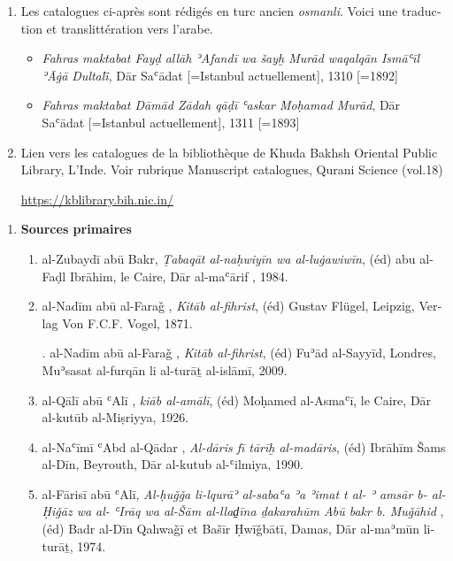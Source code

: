\documentclass[a4paper,12pt]{report}
\begin{document}
\begin{french}
\begin{enumerate}
\item Les catalogues ci-après sont rédigés en turc ancien \textit{osmanli}. Voici une traduction et translittération vers l'arabe.

\begin{itemize}
    \item  \textit{Fahras maktabat Fayḍ allāh ʾAfandī wa šayḫ Murād waqalqān Ismāʿīl  ʾĀġā Dultali}̄,  Dār Saʿādat [=Istanbul actuellement], 1310 [=1892]  
    
    \item \textit{ Fahras maktabat Dāmād Zādah qāḍī ʿaskar Moḥamad Murād},  Dār Saʿādat [=Istanbul actuellement], 1311 [=1893]  
\end{itemize}
    \item  Lien vers les catalogues de la bibliothèque de  Khuda Bakhsh Oriental Public Library, L'Inde.   Voir rubrique Manuscript catalogues, Qurani Science (vol.18)
  
  \url{https://kblibrary.bih.nic.in/}
    
   
\end{enumerate}
 \newpage  
\begin{enumerate} [III]
   
   \item  \textbf  {Sources primaires}
    
    \begin{enumerate}
       \normalsize

        \item al-Zubaydī abū Bakr, \textit {Ṭabaqāt al-naḥwiyīn wa al-luġawiwīn}, (éd) abu al-Faḍl Ibrāhim,  le Caire, Dār al-maʿārif , 1984.

        \item  al-Nadīm abū al-Faraǧ , \textit{Kitāb al-fihrist}, (éd) Gustav Flügel, Leipzig, Verlag Von F.C.F. Vogel, 1871. 
        
       \textemdash\textemdash  . al-Nadīm abū al-Faraǧ , \textit{Kitāb al-fihrist}, (éd) Fuʾād al-Sayyīd, Londres, Muʾsasat al-furqān  li al-turāṯ al-islāmī, 2009.

\item  al-Q\=al\=i abū  ʿAlī ,  \textit{ ki\=ab al-am\=al\=i}, (éd) Moḥamed al-Asmaʿī, le Caire,  Dār al-kutūb al-Miṣriyya, 1926. 
      \item al-Naʿīmī ʿAbd al-Qādar  , \textit{Al-dāris fī tārīḫ al-madāris}, (éd) Ibrāhīm Šams al-Dīn, Beyrouth, Dār al-kutub al-ʿilmiya, 1990. 

      \item 
 al-Fārisī abū ʿAlī, \textit{ Al-ḥuǧǧa li-lqurāʾ al-sabaʿa
 ʾa ʾimat  t  al-  ʾ amsār b- al-Ḥiǧāz wa  al- ʿIrāq wa al-Šām al-llad̠īna ḏakarahūm Abū bakr b. Muǧāhid     }, (éd) Badr al-Dīn Qahwaǧī et Bašīr Ḥwīǧbāt\=i, Damas,  Dār al-maʾmūn li-turāṯ,  1974.


\end{enumerate}
\end{enumerate}
\end{french}
\end{document}
